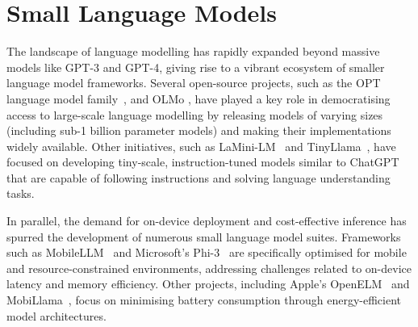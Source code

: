 

\section{Small Language Models}

The landscape of language modelling has rapidly expanded beyond massive models like GPT-3 and GPT-4, giving rise to a vibrant ecosystem of smaller language model frameworks. Several open-source projects, such as the OPT language model family~\citep{zhang2022opt},  \citep{biderman2023pythia} and OLMo \citep{groeneveld2024olmo}, have played a key role in democratising access to large-scale language modelling by releasing models of varying sizes (including sub-1 billion parameter models) and making their implementations widely available. Other initiatives, such as LaMini-LM~\citep{wu2024lamini} and TinyLlama~\citep{zhang2024tinyllama}, have focused on developing tiny-scale, instruction-tuned models similar to ChatGPT that are capable of following instructions and solving language understanding tasks.

In parallel, the demand for on-device deployment and cost-effective inference has spurred the development of numerous small language model suites. Frameworks such as MobileLLM~\citep{liu2024mobilellm} and Microsoft's Phi-3~\citep{abdin2024phi} are specifically optimised for mobile and resource-constrained environments, addressing challenges related to on-device latency and memory efficiency. Other projects, including Apple's OpenELM~\citep{mehta2024openelm} and MobiLlama~\citep{thawakar2024mobillama}, focus on minimising battery consumption through energy-efficient model architectures.

